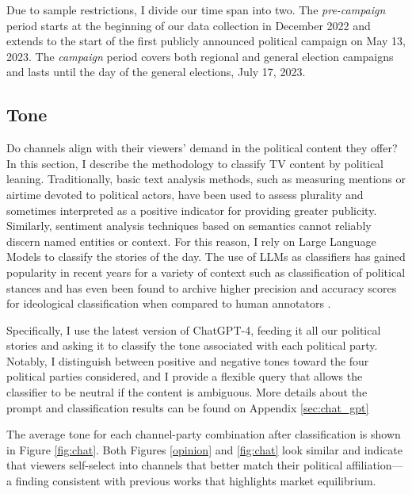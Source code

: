 \documentclass[12pt]{article}
\begin{document}
	Due to sample restrictions, I divide our time span into two. The \textit{pre-campaign} period starts at the beginning of our data collection in December 2022 and extends to the start of the first publicly announced political campaign on May 13, 2023. The \textit{campaign} period covers both regional and general election campaigns and lasts until the day of the general elections, July 17, 2023.
	
	
	\subsection{ Tone}
	
	
	Do channels align with their viewers' demand in the political content they offer? In this section, I describe the methodology to classify TV content by political leaning. Traditionally, basic text analysis methods, such as measuring mentions or airtime devoted to political actors, have been used to assess plurality and sometimes interpreted as a positive indicator for providing greater publicity. Similarly, sentiment analysis techniques based on semantics cannot reliably discern named entities or context. For this reason, I rely on Large Language Models to classify the stories of the day. The use of LLMs as classifiers has gained popularity in recent years for a variety of context such as classification of political stances \citep{lemens} and has even been found to archive higher precision and accuracy scores for ideological classification when compared to human annotators \citep{tornberg2023}.
	
	Specifically, I use the latest version of ChatGPT-4, feeding it all our political stories and asking it to classify the tone associated with each political party. Notably, I distinguish between positive and negative tones toward the four political parties considered, and I provide a flexible query that allows the classifier to be neutral if the content is ambiguous. More details about the prompt and classification results can be found on Appendix \ref{sec:chat_gpt}
	
	The average tone for each channel-party combination after classification is shown in Figure \ref{fig:chat}. Both Figures \ref{opinion} and \ref{fig:chat} look similar and indicate that viewers self-select into channels that better match their political affiliation—a finding consistent with previous works \citep{gentzkow2011competition} that highlights market equilibrium.
	
	
	
\end{document}

